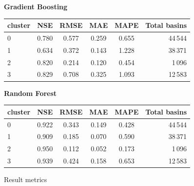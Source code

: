 \begin{figure}

    \begin{center}
        \textbf{Gradient Boosting}\\[0.2cm]
        \begin{tabular}{
                l    %
                c    %
                c    %
                c    %
                c    %
                r    %
            }
            \toprule
            \textbf{cluster} & \textbf{NSE} & \textbf{RMSE} & \textbf{MAE} & \textbf{MAPE} & \textbf{Total basins} \\
            \midrule
            0                & 0.780        & 0.577         & 0.259        & 0.655         & 44\,544               \\
            1                & 0.634        & 0.372         & 0.143        & 1.228         & 38\,371               \\
            2                & 0.820        & 0.214         & 0.120        & 0.454         & 1\,096                \\
            3                & 0.829        & 0.708         & 0.325        & 1.093         & 12\,583               \\
            \bottomrule
        \end{tabular}

        \vspace{1.0em}  %

        \textbf{Random Forest}\\[0.2cm]
        \begin{tabular}{
                l
                c
                c
                c
                c
                r
            }
            \toprule
            \textbf{cluster} & \textbf{NSE} & \textbf{RMSE} & \textbf{MAE} & \textbf{MAPE} & \textbf{Total basins} \\
            \midrule
            0                & 0.922        & 0.343         & 0.149        & 0.428         & 44\,544               \\
            1                & 0.909        & 0.185         & 0.070        & 0.590         & 38\,371               \\
            2                & 0.950        & 0.112         & 0.052        & 0.173         & 1\,096                \\
            3                & 0.939        & 0.424         & 0.158        & 0.653         & 12\,583               \\
            \bottomrule
        \end{tabular}
    \end{center}
    \label{fig:results_metrics}
    \caption{Result metrics}
\end{figure}


